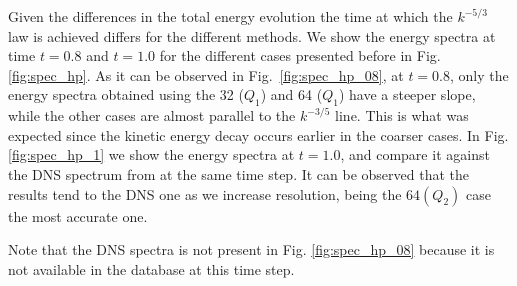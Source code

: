 Given the differences in the total energy evolution the time at which the $k^{-5/3}$ law is achieved differs for the different methods. We show the energy spectra at time $t=0.8$ and $t=1.0$ for the different cases presented before in Fig. \ref{fig:spec_hp}. As it can be observed in Fig.~\ref{fig:spec_hp_08}, at $t=0.8$, only the energy spectra obtained using the 32 ($Q_1$) and  64 ($Q_1$) have a steeper slope, while the other cases are almost parallel to the $k^{-3/5}$ line. This is what was expected since the kinetic energy decay occurs earlier in the coarser cases.
In Fig. \ref{fig:spec_hp_1} we show the energy spectra at $t=1.0$, and compare it against the DNS spectrum from \cite{_selection_????} at the same time step. It can be observed that the results tend to the DNS one as we increase resolution, being the $64(Q_2)$ case the most accurate one.

Note that the DNS spectra is not present in Fig. \ref{fig:spec_hp_08} because it is not available in the database \cite{_selection_????} at this time step.


